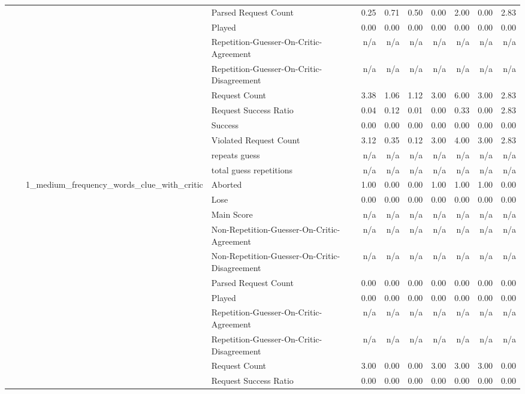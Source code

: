 \begin{tabular}{llllrrrrrrr}
 &  &  & Parsed Request Count & 0.25 & 0.71 & 0.50 & 0.00 & 2.00 & 0.00 & 2.83 \\
 &  &  & Played & 0.00 & 0.00 & 0.00 & 0.00 & 0.00 & 0.00 & 0.00 \\
 &  &  & Repetition-Guesser-On-Critic-Agreement & n/a & n/a & n/a & n/a & n/a & n/a & n/a \\
 &  &  & Repetition-Guesser-On-Critic-Disagreement & n/a & n/a & n/a & n/a & n/a & n/a & n/a \\
 &  &  & Request Count & 3.38 & 1.06 & 1.12 & 3.00 & 6.00 & 3.00 & 2.83 \\
 &  &  & Request Success Ratio & 0.04 & 0.12 & 0.01 & 0.00 & 0.33 & 0.00 & 2.83 \\
 &  &  & Success & 0.00 & 0.00 & 0.00 & 0.00 & 0.00 & 0.00 & 0.00 \\
 &  &  & Violated Request Count & 3.12 & 0.35 & 0.12 & 3.00 & 4.00 & 3.00 & 2.83 \\
 &  &  & repeats guess & n/a & n/a & n/a & n/a & n/a & n/a & n/a \\
 &  &  & total guess repetitions & n/a & n/a & n/a & n/a & n/a & n/a & n/a \\
\cline{3-11}
 &  & \multirow[t]{15}{*}{1_medium_frequency_words_clue_with_critic} & Aborted & 1.00 & 0.00 & 0.00 & 1.00 & 1.00 & 1.00 & 0.00 \\
 &  &  & Lose & 0.00 & 0.00 & 0.00 & 0.00 & 0.00 & 0.00 & 0.00 \\
 &  &  & Main Score & n/a & n/a & n/a & n/a & n/a & n/a & n/a \\
 &  &  & Non-Repetition-Guesser-On-Critic-Agreement & n/a & n/a & n/a & n/a & n/a & n/a & n/a \\
 &  &  & Non-Repetition-Guesser-On-Critic-Disagreement & n/a & n/a & n/a & n/a & n/a & n/a & n/a \\
 &  &  & Parsed Request Count & 0.00 & 0.00 & 0.00 & 0.00 & 0.00 & 0.00 & 0.00 \\
 &  &  & Played & 0.00 & 0.00 & 0.00 & 0.00 & 0.00 & 0.00 & 0.00 \\
 &  &  & Repetition-Guesser-On-Critic-Agreement & n/a & n/a & n/a & n/a & n/a & n/a & n/a \\
 &  &  & Repetition-Guesser-On-Critic-Disagreement & n/a & n/a & n/a & n/a & n/a & n/a & n/a \\
 &  &  & Request Count & 3.00 & 0.00 & 0.00 & 3.00 & 3.00 & 3.00 & 0.00 \\
 &  &  & Request Success Ratio & 0.00 & 0.00 & 0.00 & 0.00 & 0.00 & 0.00 & 0.00 \\

\end{tabular}
